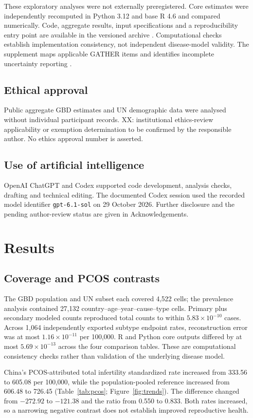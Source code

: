 \documentclass[11pt,a4paper]{article}
\begin{document}
These exploratory analyses were not externally preregistered. Core estimates were independently recomputed in Python 3.12 and base R 4.6 and compared numerically. Code, aggregate results, input specifications and a reproducibility entry point are available in the versioned archive \citep{repository}. Computational checks establish implementation consistency, not independent disease-model validity. The supplement maps applicable GATHER items and identifies incomplete uncertainty reporting \citep{gather}.

\subsection{Ethical approval}
Public aggregate GBD estimates and UN demographic data were analysed without individual participant records. XX: institutional ethics-review applicability or exemption determination to be confirmed by the responsible author. No ethics approval number is asserted.

\subsection{Use of artificial intelligence}
OpenAI ChatGPT and Codex supported code development, analysis checks, drafting and technical editing. The documented Codex session used the recorded model identifier \texttt{gpt-6.1-sol} on 29 October 2026. Further disclosure and the pending author-review status are given in Acknowledgements.

\section{Results}
\subsection{Coverage and PCOS contrasts}
The GBD population and UN subset each covered 4,522 cells; the prevalence analysis contained 27,132 country--age--year--cause--type cells. Primary plus secondary modeled counts reproduced total counts to within $5.83\times10^{-10}$ cases. Across 1,064 independently exported subtype endpoint rates, reconstruction error was at most $1.16\times10^{-11}$ per 100,000. R and Python core outputs differed by at most $5.69\times10^{-13}$ across the four comparison tables. These are computational consistency checks rather than validation of the underlying disease model.

China's PCOS-attributed total infertility standardized rate increased from 333.56 to 605.08 per 100,000, while the population-pooled reference increased from 606.48 to 726.45 (Table~\ref{tab:pcos}; Figure~\ref{fig:trends}). The difference changed from $-272.92$ to $-121.38$ and the ratio from 0.550 to 0.833. Both rates increased, so a narrowing negative contrast does not establish improved reproductive health.
\end{document}

